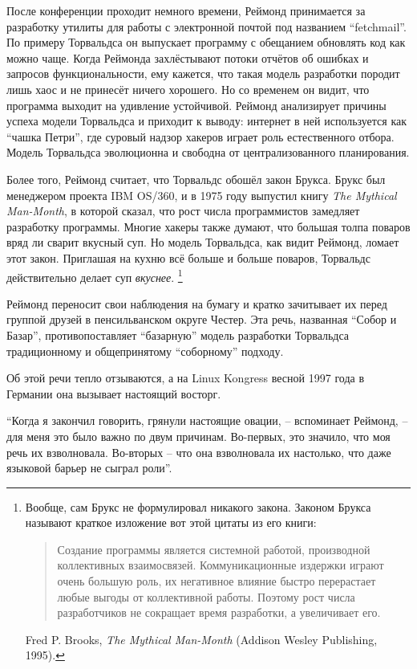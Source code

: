 После конференции проходит немного времени, Реймонд принимается за разработку утилиты для работы с электронной почтой под названием \enquote{fetchmail}. По примеру Торвальдса он выпускает программу с обещанием обновлять код как можно чаще. Когда Реймонда захлёстывают потоки отчётов об ошибках и запросов функциональности, ему кажется, что такая модель разработки породит лишь хаос и не принесёт ничего хорошего. Но со временем он видит, что программа выходит на удивление устойчивой. Реймонд анализирует причины успеха модели Торвальдса и приходит к выводу: интернет в ней используется как \enquote{чашка Петри}, где суровый надзор хакеров играет роль естественного отбора. Модель Торвальдса эволюционна и свободна от централизованного планирования.

Более того, Реймонд считает, что Торвальдс обошёл закон Брукса. Брукс был менеджером проекта IBM OS/360, и в 1975 году выпустил книгу \textit{The Mythical Man-Month}, в которой сказал, что рост числа программистов замедляет разработку программы. Многие хакеры также думают, что большая толпа поваров вряд ли сварит вкусный суп. Но модель Торвальдса, как видит Реймонд, ломает этот закон. Приглашая на кухню всё больше и больше поваров, Торвальдс действительно делает суп \textit{вкуснее}. \footnote{Вообще, сам Брукс не формулировал никакого закона. Законом Брукса называют краткое изложение вот этой цитаты из его книги:

\begin{quote}
Создание программы является системной работой, производной коллективных взаимосвязей. Коммуникационные издержки играют очень большую роль, их негативное влияние быстро перерастает любые выгоды от коллективной работы. Поэтому рост числа разработчиков не сокращает время разработки, а увеличивает его.
\end{quote}

\noindent Fred P. Brooks, \textit{The Mythical Man-Month} (Addison Wesley Publishing, 1995).}

Реймонд переносит свои наблюдения на бумагу и кратко зачитывает их перед группой друзей в пенсильванском округе Честер. Эта речь, названная \enquote{Собор и Базар}, противопоставляет \enquote{базарную} модель разработки Торвальдса традиционному и общепринятому \enquote{соборному} подходу.

Об этой речи тепло отзываются, а на Linux Kongress весной 1997 года в Германии она вызывает настоящий восторг.

\enquote{Когда я закончил говорить, грянули настоящие овации, -- вспоминает Реймонд, -- для меня это было важно по двум причинам. Во-первых, это значило, что моя речь их взволновала. Во-вторых -- что она взволновала их настолько, что даже языковой барьер не сыграл роли}.

